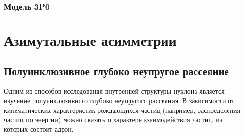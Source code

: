 \documentclass{extarticle}
\begin{document}
\subsubsection{Модель 3P0}
\newpage
\section{Азимутальные асимметрии}
\subsection{Полуинклюзивное глубоко неупругое рассеяние}
Одним из способов исследования внутренней структуры нуклона является изучение полуинклюзивного глубоко неупругого рассеяния. В зависимости от кинематических характеристик рождающихся частиц (например, распределения частиц по энергии) можно сказать о характере взаимодействия частиц, из которых состоит адрон. 
\end{document}
